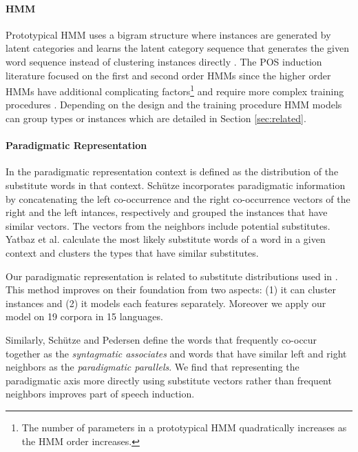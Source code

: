 \paragraph{HMM} 
Prototypical HMM uses a bigram structure where instances are generated by
latent categories and learns the latent category sequence that
generates the given word sequence instead of clustering instances
directly
\cite{Brown:1992:CNG:176313.176316,blunsom-cohn:2011:ACL-HLT2011,goldwater-griffiths:2007:ACLMain,johnson:2007:EMNLP-CoNLL2007,Ganchev:2010:PRS:1859890.1859918,bergkirkpatrick-klein:2010:ACL,Lee:2010:STU:1870658.1870741}.
The POS induction literature focused on the first and second order
HMMs since the higher order HMMs have additional complicating
factors\footnote{The number of parameters in a prototypical HMM
  quadratically increases as the HMM order increases.}  and require
more complex training procedures \cite{johnson:2007:EMNLP-CoNLL2007}.
Depending on the design and the training procedure HMM models can
group types or instances which are detailed in Section \ref{sec:related}.

\paragraph{Paradigmatic Representation} 

In the paradigmatic representation context is defined as the distribution of
the substitute words in that context.  Sch\"{u}tze
 incorporates paradigmatic
information by concatenating the left co-occurrence and the right co-occurrence
vectors of the right and the left intances, respectively and grouped the instances
that have similar vectors.  The vectors from the neighbors include potential
substitutes.  Yatbaz et al. 
calculate the most likely substitute words of a word in a given context and
clusters the types that have similar substitutes.

Our paradigmatic representation is related to substitute distributions used in
\cite{yatbaz-sert-yuret:2012:EMNLP-CoNLL}.  This method improves on their
foundation from two aspects: (1) it can cluster instances and (2) it models each
features separately.  Moreover we apply our model on 19 corpora in 15
languages. 

Similarly, Sch{\"u}tze and Pedersen  define the
words that frequently co-occur together as the {\em syntagmatic
  associates} and words that have similar left and right neighbors as
the {\em paradigmatic parallels}.  We find that representing the
paradigmatic axis more directly using substitute vectors rather than
frequent neighbors improves part of speech induction.

